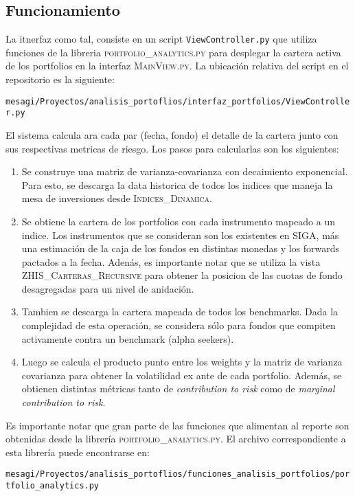 \documentclass{article}
\begin{document}
\subsection{Funcionamiento}

La itnerfaz como tal, consiste en un script \texttt{ViewController.py} que utiliza funciones de la libreria \textsc{portfolio\_analytics.py} para desplegar la cartera activa de los portfolios en la interfaz \textsc{MainView.py}. La ubicación relativa del script en el repositorio es la siguiente:
\begin{center}
\texttt{mesagi/Proyectos/analisis\_portoflios/interfaz\_portfolios/ViewController.py}
\end{center}

El sistema calcula ara cada par (fecha, fondo) el detalle de la cartera junto con sus respectivas metricas de riesgo. Los pasos para calcularlas son los siguientes:

\begin{enumerate}
\item Se construye una matriz de varianza-covarianza con decaimiento exponencial. Para esto, se descarga la data historica de todos los indices que maneja la mesa de inversiones desde \textsc{Indices\_Dinamica}.
\item Se obtiene la cartera de los portfolios con cada instrumento mapeado a un indice. Los instrumentos que se consideran son los existentes en SIGA, más una estimación de la caja de los fondos en distintas monedas y los forwards pactados a la fecha. Adenás, es importante notar que se utiliza la vista \textsc{ZHIS\_Carteras\_Recursive} para obtener la posicion de las cuotas de fondo desagregadas para un nivel de anidación.
\item Tambien se descarga la cartera mapeada de todos los benchmarks. Dada la complejidad de esta operación, se considera sólo para fondos que compiten activamente contra un benchmark (alpha seekers).
\item Luego se calcula el producto punto entre los weights y la matriz de varianza covarianza para obtener la volatilidad ex ante de cada portfolio. Además, se obtienen distintas métricas tanto de \emph{contribution to risk} como de \emph{marginal contribution to risk}.
\end{enumerate}

Es importante notar que gran parte de las funciones que alimentan al reporte son obtenidas desde la librería \textsc{portfolio\_analytics.py}. El archivo correspondiente a esta librería puede encontrarse en: 
\begin{center}
\texttt{mesagi/Proyectos/analisis\_portoflios/funciones\_analisis\_portfolios/portfolio\_analytics.py}
\end{center}
\end{document}
